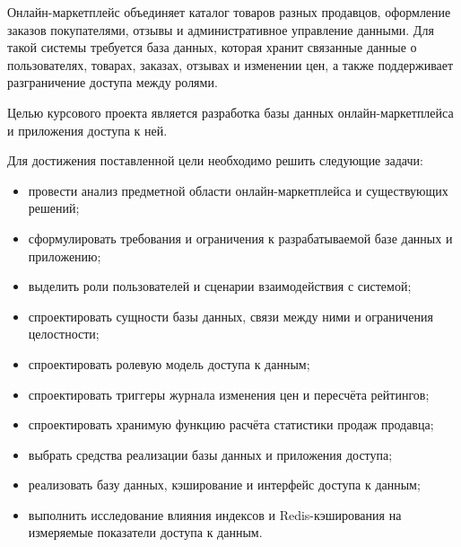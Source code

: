 

Онлайн-маркетплейс объединяет каталог товаров разных продавцов, оформление заказов покупателями, отзывы и административное управление данными. Для такой системы требуется база данных, которая хранит связанные данные о пользователях, товарах, заказах, отзывах и изменении цен, а также поддерживает разграничение доступа между ролями.

Целью курсового проекта является разработка базы данных онлайн-маркетплейса и приложения доступа к ней.

Для достижения поставленной цели необходимо решить следующие задачи:
\begin{itemize}
    \item провести анализ предметной области онлайн-маркетплейса и существующих решений;
    \item сформулировать требования и ограничения к разрабатываемой базе данных и приложению;
    \item выделить роли пользователей и сценарии взаимодействия с системой;
    \item спроектировать сущности базы данных, связи между ними и ограничения целостности;
    \item спроектировать ролевую модель доступа к данным;
    \item спроектировать триггеры журнала изменения цен и пересчёта рейтингов;
    \item спроектировать хранимую функцию расчёта статистики продаж продавца;
    \item выбрать средства реализации базы данных и приложения доступа;
    \item реализовать базу данных, кэширование и интерфейс доступа к данным;
    \item выполнить исследование влияния индексов и Redis-кэширования на измеряемые показатели доступа к данным.
\end{itemize}

\clearpage
